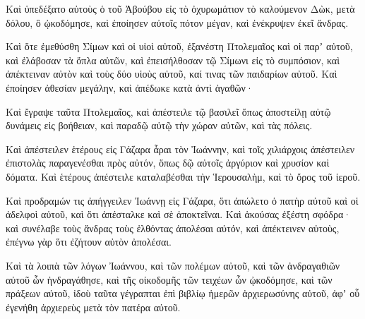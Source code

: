 {Καὶ ὑπεδέξατο αὐτοὺς ὁ τοῦ Ἀβούβου εἰς τὸ ὀχυρωμάτιον τὸ καλούμενον Δὼκ, μετὰ δόλου, ὃ ᾠκοδόμησε, καὶ ἐποίησεν αὐτοῖς πότον μέγαν, καὶ ἐνέκρυψεν ἐκεῖ ἄνδρας.
\par }{\PP {}Καὶ ὅτε ἐμεθύσθη Σίμων καὶ οἱ υἱοὶ αὐτοῦ, ἐξανέστη Πτολεμαῖος καὶ οἱ παρʼ αὐτοῦ, καὶ ἐλάβοσαν τὰ ὅπλα αὐτῶν, καὶ ἐπεισήλθοσαν τῷ Σίμωνι εἰς τὸ συμπόσιον, καὶ ἀπέκτειναν αὐτὸν καὶ τοὺς δύο υἱοὺς αὐτοῦ, καί τινας τῶν παιδαρίων αὐτοῦ.
Καὶ ἐποίησεν ἀθεσίαν μεγάλην, καὶ ἀπέδωκε κατὰ ἀντὶ ἀγαθῶν·
\par }{\PP {}Καὶ ἔγραψε ταῦτα Πτολεμαῖος, καὶ ἀπέστειλε τῷ βασιλεῖ ὅπως ἀποστείλῃ αὐτῷ δυνάμεις εἰς βοήθειαν, καὶ παραδῷ αὐτῷ τὴν χώραν αὐτῶν, καὶ τὰς πόλεις.
\par }{\PP {}Καὶ ἀπέστειλεν ἑτέρους εἰς Γάζαρα ἆραι τὸν Ἰωάννην, καὶ τοῖς χιλιάρχοις ἀπέστειλεν ἐπιστολὰς παραγενέσθαι πρὸς αὐτόν, ὅπως δῷ αὐτοῖς ἀργύριον καὶ χρυσίον καὶ δόματα.
Καὶ ἑτέρους ἀπέστειλε καταλαβέσθαι τὴν Ἱερουσαλὴμ, καὶ τὸ ὄρος τοῦ ἱεροῦ.
\par }{\PP {}Καὶ προδραμών τις ἀπήγγειλεν Ἰωάννῃ εἰς Γάζαρα, ὅτι ἀπώλετο ὁ πατὴρ αὐτοῦ καὶ οἱ ἀδελφοὶ αὐτοῦ, καὶ ὅτι ἀπέσταλκε καὶ σὲ ἀποκτεῖναι.
Καὶ ἀκούσας ἐξέστη σφόδρα· καὶ συνέλαβε τοὺς ἄνδρας τοὺς ἐλθόντας ἀπολέσαι αὐτόν, καὶ ἀπέκτεινεν αὐτοὺς, ἐπέγνω γὰρ ὅτι ἐζήτουν αὐτὸν ἀπολέσαι.
\par }{\PP {}Καὶ τὰ λοιπὰ τῶν λόγων Ἰωάννου, καὶ τῶν πολέμων αὐτοῦ, καὶ τῶν ἀνδραγαθιῶν αὐτοῦ ὧν ἠνδραγάθησε, καὶ τῆς οἰκοδομῆς τῶν τειχέων ὧν ᾠκοδόμησε, καὶ τῶν πράξεων αὐτοῦ,
ἰδοὺ ταῦτα γέγραπται ἐπὶ βιβλίῳ ἡμερῶν ἀρχιερωσύνης αὐτοῦ, ἀφʼ οὗ ἐγενήθη ἀρχιερεὺς μετὰ τὸν πατέρα αὐτοῦ.
\par }